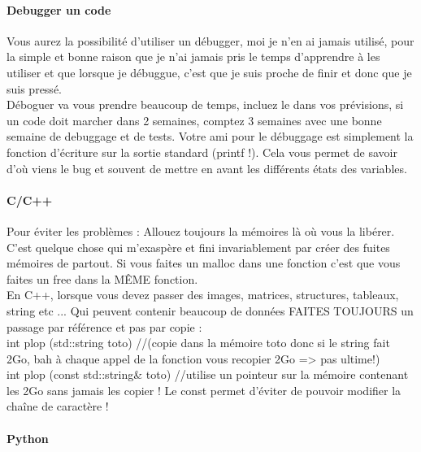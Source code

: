 \paragraph{Debugger un code}

Vous aurez la possibilité d'utiliser un débugger, moi je n'en ai jamais utilisé, pour la simple et
 bonne raison que je n'ai jamais pris le temps d'apprendre à les utiliser et que lorsque je débuggue,
 c'est que je suis proche de finir et donc que je suis pressé.\\
Déboguer va vous prendre beaucoup de temps, incluez le dans vos prévisions, si un code doit marcher 
dans 2 semaines, comptez 3 semaines avec une bonne semaine de debuggage et de tests. Votre ami pour
 le débuggage est simplement la fonction d'écriture sur la sortie standard (printf !). Cela vous 
permet de savoir d'où  viens le bug et souvent de mettre en avant les différents états des variables.\\


\paragraph{C/C++}

Pour éviter les problèmes : Allouez toujours la mémoires là où vous la libérer. C'est quelque chose
 qui m'exaspère et fini invariablement par créer des fuites mémoires de partout. Si vous faites 
un malloc dans une fonction c'est que vous faites un free dans la MÊME fonction. \\

En C++, lorsque vous devez passer des images, matrices, structures, tableaux, string  etc ... Qui 
peuvent contenir beaucoup de données FAITES TOUJOURS un passage par référence et pas par copie :\\

int plop (std::string toto) //(copie dans la mémoire toto donc si le string fait 2Go, bah à chaque
 appel de la fonction vous recopier 2Go => pas ultime!)\\

int plop (const std::string\& toto) //utilise un pointeur sur la mémoire contenant les 2Go sans
 jamais les copier ! Le const permet d'éviter de pouvoir modifier la chaîne de caractère !\\

\paragraph{Python}

